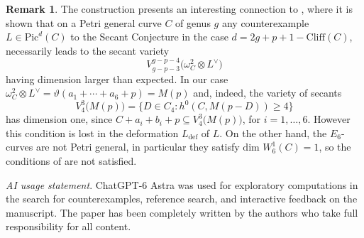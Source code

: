 \documentclass[11pt]{amsart}
\theoremstyle{definition}
\newtheorem{remark}[theorem]{Remark}
\begin{document}
\begin{remark}
The construction presents an interesting connection to \cite[Theorem 1.7]{FK}, where it is shown that on a Petri general curve $C$ of genus $g$ any  counterexample $L\in \mbox{Pic}^d(C)$ to the Secant Conjecture in the case $d=2g+p+1-\mbox{Cliff}(C)$, necessarily leads to the secant variety 
$$V_{g-p-3}^{g-p-4}\bigl(\omega_C^2\otimes L^{\vee}\bigr)$$ having dimension larger than expected. In our case $\omega_C^2\otimes L^{\vee}=\vartheta(a_1+\cdots+a_6+p)=M(p)$ and, indeed, the variety of secants 
$$V_4^3\bigl(M(p)\bigr)=\bigl\{D\in C_4: h^0(C, M(p-D))\geq 4\bigr\} $$
has dimension one, since $C+a_i+b_i+p\subseteq V_4^3\bigl(M(p)\bigr)$, for $i=1, \ldots, 6$. However this condition is lost in the deformation $L_{\mathrm{def}}$ of $L$. On the other hand, the $E_6$-curves are not Petri general, in particular they satisfy $\mbox{dim } W^1_6(C) = 1$, so the conditions of \cite[Theorem 1.7]{FK} are not satisfied.
\end{remark}



\vskip 9pt

\noindent
\emph{AI usage statement}.
ChatGPT-6 Astra was used for exploratory computations in the search for counterexamples, reference search, and interactive feedback on the manuscript. The paper has been completely written by the authors who take full responsibility for all content.
\end{document}
